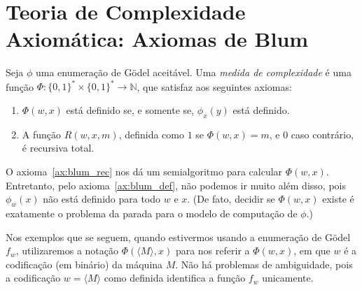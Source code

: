 \section{Teoria de Complexidade Axiomática: Axiomas de Blum}
\label{sec:blum_axioms}

\begin{definition}
    Seja $\phi$ uma enumeração de Gödel aceitável.
    Uma \emph{medida de complexidade} é uma função
    $\Phi: \{0, 1\}^* \times \{0, 1\}^* \to \mathbb N$,
    que satisfaz aos seguintes axiomas:\footnotemark
    \begin{enumerate} [label=\textbf{Axioma \arabic*}, ref=\arabic*, align=left]
        \item
            \label{ax:blum_def}
            $\Phi(w, x)$ está definido
            se, e somente se,
            $\phi_x(y)$ está definido.
        \item
            \label{ax:blum_rec}
            A função $R(w, x, m)$,
            definida como $1$ se $\Phi(w, x) = m$,
            e $0$ caso contrário,
            é recursiva total.
    \end{enumerate}

\end{definition}

O axioma~\ref{ax:blum_rec}
nos dá um semialgoritmo para calcular $\Phi(w, x)$.
Entretanto, pelo axioma~\ref{ax:blum_def},
não podemos ir muito além disso,
pois $\phi_w(x)$ não está definido para todo $w$ e $x$.
(De fato, decidir se $\Phi(w, x)$ existe
é exatamente o problema da parada para o modelo de computação de $\phi$.)

Nos exemplos que se seguem,
quando estivermos usando a enumeração de Gödel $f_w$,
utilizaremos a notação $\Phi(\langle M \rangle, x)$
para nos referir a $\Phi(w, x)$,
em que $w$ é a codificação (em binário) da máquina $M$.
Não há problemas de ambiguidade,
pois a codificação $w = \langle M \rangle$ como definida
identifica a função $f_w$ unicamente.

